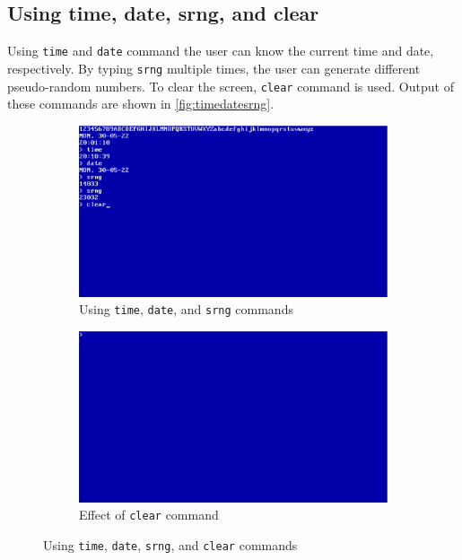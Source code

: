 \subsection{Using time, date, srng, and clear}
Using \texttt{time} and \texttt{date} command the user can know the current time and date, respectively. By typing \texttt{srng} multiple times, the user can generate different pseudo-random numbers. To clear the screen, \texttt{clear} command is used. Output of these commands are shown in \autoref{fig:timedatesrng}.
\begin{figure}[H]
  \begin{subfigure}{.5\textwidth}
  \centering
  \includegraphics[scale=0.13]{figures/timedatesrng.eps}
  \caption{Using \texttt{time}, \texttt{date}, and \texttt{srng} commands}
  \end{subfigure}
  \begin{subfigure}{.5\textwidth}
  \centering
  \includegraphics[scale=0.13]{figures/cleareffect.eps}
  \caption{Effect of \texttt{clear} command}
  \end{subfigure}
\caption{Using \texttt{time}, \texttt{date}, \texttt{srng}, and \texttt{clear} commands}
\label{fig:timedatesrng}
\end{figure}

